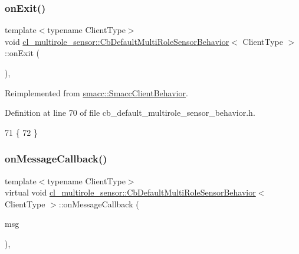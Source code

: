 \subsubsection{\texorpdfstring{on\+Exit()}{onExit()}}
{\footnotesize\ttfamily template$<$typename Client\+Type$>$ \\
void \hyperlink{classcl__multirole__sensor_1_1CbDefaultMultiRoleSensorBehavior}{cl\+\_\+multirole\+\_\+sensor\+::\+Cb\+Default\+Multi\+Role\+Sensor\+Behavior}$<$ Client\+Type $>$\+::on\+Exit (\begin{DoxyParamCaption}{ }\end{DoxyParamCaption})\hspace{0.3cm}{\ttfamily [inline]}, {\ttfamily [virtual]}}



Reimplemented from \hyperlink{classsmacc_1_1SmaccClientBehavior_a7e4fb6ce81ff96dc172425852d69c0c5}{smacc\+::\+Smacc\+Client\+Behavior}.



Definition at line 70 of file cb\+\_\+default\+\_\+multirole\+\_\+sensor\+\_\+behavior.\+h.


\begin{DoxyCode}
71   \{
72   \}
\end{DoxyCode}
\mbox{\label{classcl__multirole__sensor_1_1CbDefaultMultiRoleSensorBehavior_a80a89078befa7f6d813fb3c5773bc83c}} 
\subsubsection{\texorpdfstring{on\+Message\+Callback()}{onMessageCallback()}}
{\footnotesize\ttfamily template$<$typename Client\+Type$>$ \\
virtual void \hyperlink{classcl__multirole__sensor_1_1CbDefaultMultiRoleSensorBehavior}{cl\+\_\+multirole\+\_\+sensor\+::\+Cb\+Default\+Multi\+Role\+Sensor\+Behavior}$<$ Client\+Type $>$\+::on\+Message\+Callback (\begin{DoxyParamCaption}\item[{const \hyperlink{classcl__multirole__sensor_1_1CbDefaultMultiRoleSensorBehavior_aa23bc8c99de1eddad01d094bdab62aa4}{T\+Message\+Type} \&}]{msg }\end{DoxyParamCaption})\hspace{0.3cm}{\ttfamily [inline]}, {\ttfamily [virtual]}}



